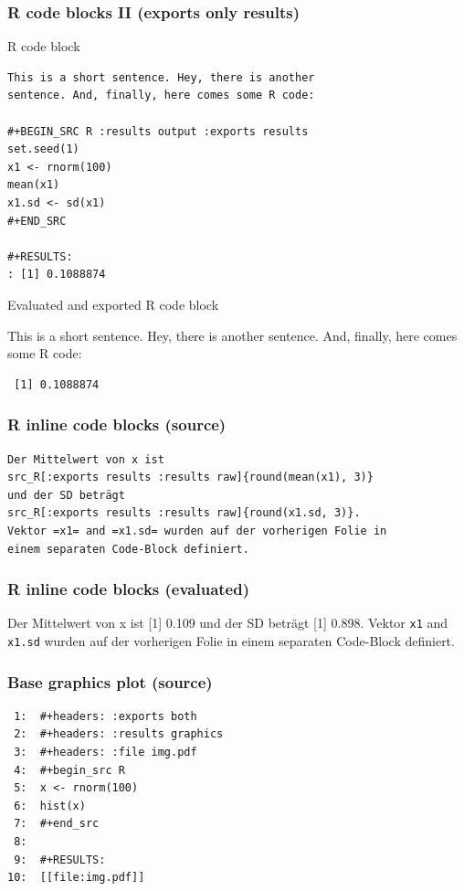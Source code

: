 \documentclass[bigger]{beamer}
\begin{document}
\begin{frame}[fragile,t, shrink = 15]
\frametitle{R code blocks II (exports only results)}
\label{sec-3-1-3}
\begin{block}{R code block}
\label{sec-3-1-3-1}


\begin{verbatim}
This is a short sentence. Hey, there is another 
sentence. And, finally, here comes some R code:

#+BEGIN_SRC R :results output :exports results
set.seed(1)
x1 <- rnorm(100) 
mean(x1) 
x1.sd <- sd(x1) 
#+END_SRC

#+RESULTS:
: [1] 0.1088874
\end{verbatim}
\end{block}
\begin{block}{Evaluated and exported R code block}
\label{sec-3-1-3-2}


This is a short sentence.  Hey, there is another sentence. And, finally, here comes some R code:



\begin{verbatim}
 [1] 0.1088874
\end{verbatim}
\end{block}
\end{frame}
\begin{frame}[fragile]
\frametitle{R inline code blocks (source)}
\label{sec-3-1-4}


\begin{footnotesize}

\begin{verbatim}
Der Mittelwert von x ist 
src_R[:exports results :results raw]{round(mean(x1), 3)}
und der SD beträgt
src_R[:exports results :results raw]{round(x1.sd, 3)}. 
Vektor =x1= and =x1.sd= wurden auf der vorherigen Folie in 
einem separaten Code-Block definiert.
\end{verbatim}
\end{footnotesize}
\end{frame}
\begin{frame}
\frametitle{R inline code blocks (evaluated)}
\label{sec-3-1-5}


Der Mittelwert von x ist 
[1] 0.109
und der SD beträgt
[1] 0.898. 
Vektor \texttt{x1} and \texttt{x1.sd} wurden auf der vorherigen Folie in einem separaten
Code-Block definiert. 
\end{frame}
\begin{frame}[fragile]
\frametitle{Base graphics plot (source)}
\label{sec-3-1-6}



\begin{verbatim}
 1:  #+headers: :exports both 
 2:  #+headers: :results graphics
 3:  #+headers: :file img.pdf
 4:  #+begin_src R 
 5:  x <- rnorm(100)
 6:  hist(x)
 7:  #+end_src 
 8:  
 9:  #+RESULTS:
10:  [[file:img.pdf]]
\end{verbatim}
\end{frame}
\end{document}
